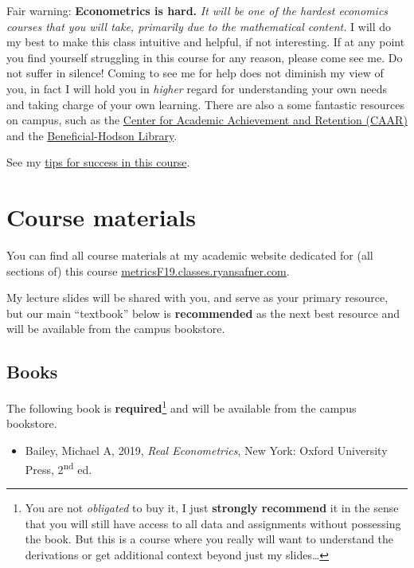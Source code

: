 \documentclass{article}
\providecommand{\tightlist}{%
  \setlength{\itemsep}{0pt}\setlength{\parskip}{0pt}}
\begin{document}
{Fair warning:} \textbf{Econometrics is hard.} \emph{It will be one of
the hardest economics courses that you will take, primarily due to the
mathematical content.} I will do my best to make this class intuitive
and helpful, if not interesting. If at any point you find yourself
struggling in this course for any reason, please come see me. Do not
suffer in silence! Coming to see me for help does not diminish my view
of you, in fact I will hold you in \emph{higher} regard for
understanding your own needs and taking charge of your own learning.
There are also a some fantastic resources on campus, such as the
\href{http://www.hood.edu/campus-services/academic-services/index.html}{Center
for Academic Achievement and Retention (CAAR)} and the
\href{http://www.hood.edu/library/\%7D\%7BBeneficial-Hodson\%20Library}{Beneficial-Hodson
Library}.

See my
\href{http://metricsf19.classes.ryansafner.com/reference\#tips}{tips for
success in this course}.

\hypertarget{course-materials}{%
\section{Course materials}\label{course-materials}}

You can find all course materials at my academic website dedicated for
(all sections of) this course
\href{http://metricsf19.classes.ryansafner.com}{metricsF19.classes.ryansafner.com}.

My lecture slides will be shared with you, and serve as your primary
resource, but our main ``textbook'' below is \textbf{recommended} as the
next best resource and will be available from the campus bookstore.

\hypertarget{books}{%
\subsection{Books}\label{books}}

The following book is \textbf{required}\footnote{You are not
  \emph{obligated} to buy it, I just \textbf{strongly recommend} it in
  the sense that you will still have access to all data and assignments
  without possessing the book. But this is a course where you really
  will want to understand the derivations or get additional context
  beyond just my slides\ldots{}} and will be available from the campus
bookstore.

\begin{itemize}
\tightlist
\item
  Bailey, Michael A, 2019, \emph{Real Econometrics}, New York: Oxford
  University Press, 2\textsuperscript{nd} ed.
\end{itemize}
\end{document}
